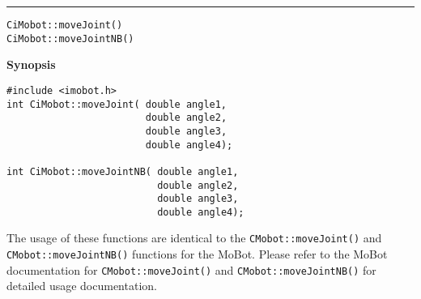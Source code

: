 \noindent
\vspace{5pt}
\rule{6.5in}{0.015in}
\noindent
{\LARGE \texttt{CiMobot::moveJoint()}}\\
{\LARGE \texttt{CiMobot::moveJointNB()}}\\
{}

\noindent
{\bf Synopsis}\\
\begin{verbatim}
#include <imobot.h>
int CiMobot::moveJoint( double angle1, 
                        double angle2, 
                        double angle3, 
                        double angle4);

int CiMobot::moveJointNB( double angle1, 
                          double angle2, 
                          double angle3, 
                          double angle4);
\end{verbatim}

The usage of these functions are identical to the
\texttt{CMobot::moveJoint()} and \texttt{CMobot::moveJointNB()} functions for the MoBot.
Please refer to the MoBot documentation for \texttt{CMobot::moveJoint()} and
\texttt{CMobot::moveJointNB()} for
detailed usage documentation.


